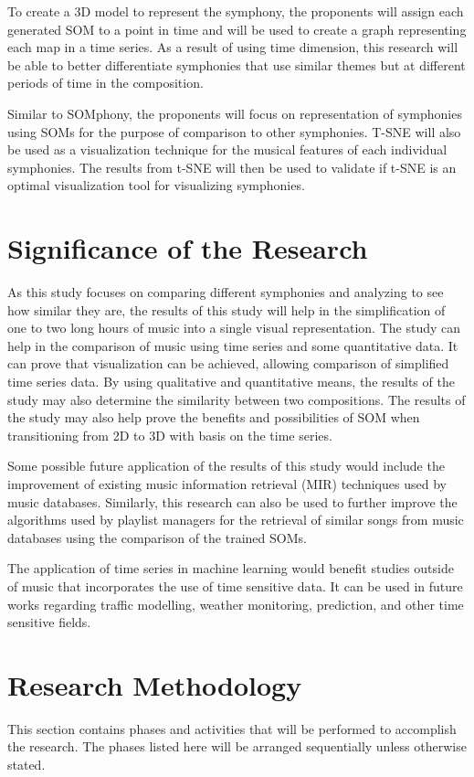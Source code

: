 To create a 3D model to represent the symphony, the proponents will assign each generated SOM to a point in time and will be used to create a graph representing each map in a time series. As a result of using time dimension, this research will be able to better differentiate symphonies that use similar themes but at different periods of time in the composition.

Similar to SOMphony, the proponents will  focus on representation of symphonies using SOMs for the purpose of comparison to other symphonies. T-SNE will also be used as a visualization technique for the musical features of each individual symphonies. The results from t-SNE will then be used to validate if t-SNE is an optimal visualization tool for visualizing symphonies.

\section{Significance of the Research}
\label{sec:significance}
As this study focuses on comparing different symphonies and analyzing to see how similar they are, the results of this study will help in the simplification of one to two long hours of music into a single visual representation.  The study can help in the comparison of music using time series and some quantitative data. It can prove that visualization can be achieved, allowing comparison of simplified time series data. By using qualitative and quantitative means, the results of the study may also determine the similarity between two compositions. The results of the study may also help prove the benefits and possibilities of SOM when transitioning from 2D to 3D with basis on the time series.

Some possible future application of the results of this study would include the improvement of existing music information retrieval (MIR) techniques used by music databases. Similarly, this research can also be used to further improve the algorithms used by playlist managers for the retrieval of similar songs from music databases using the comparison of the trained SOMs.

The application of time series in machine learning would benefit studies outside of music that incorporates the use of time sensitive data. It can be used in future works regarding traffic modelling, weather monitoring, prediction, and other time sensitive fields.

\section{Research Methodology}
\label{sec:researchmethod}
This section contains phases and activities that will be performed to accomplish the research. The phases listed here will be arranged sequentially unless otherwise stated.

